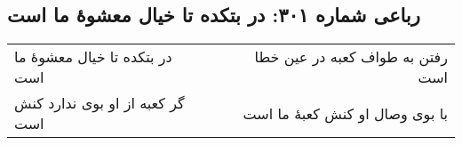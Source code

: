 \begin{center}
\section*{رباعی شماره ۳۰۱: در بتکده تا خیال معشوهٔ ما است}
\label{sec:0301}
\begin{longtable}{l p{0.5cm} r}
در بتکده تا خیال معشوهٔ ما است
&&
رفتن به طواف کعبه در عین خطا است
\\
گر کعبه از او بوی ندارد کنش است
&&
با بوی وصال او کنش کعبهٔ ما است
\\
\end{longtable}
\end{center}
